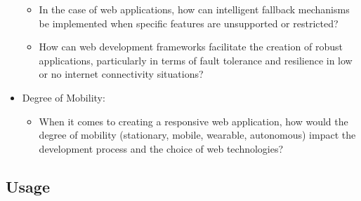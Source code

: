 \begin{itemize}
    \begin{itemize}
      \item In the case of web applications, how can intelligent fallback mechanisms be implemented when specific features are unsupported or restricted?
      \item How can web development frameworks facilitate the creation of robust applications, particularly in terms of fault tolerance and resilience in low or no internet connectivity situations?
    \end{itemize}
  \item Degree of Mobility:
    \begin{itemize}
      \item When it comes to creating a responsive web application, how would the degree of mobility (stationary, mobile, wearable, autonomous) impact the development process and the choice of web technologies?
    \end{itemize}
\end{itemize}

\subsection{Usage}

